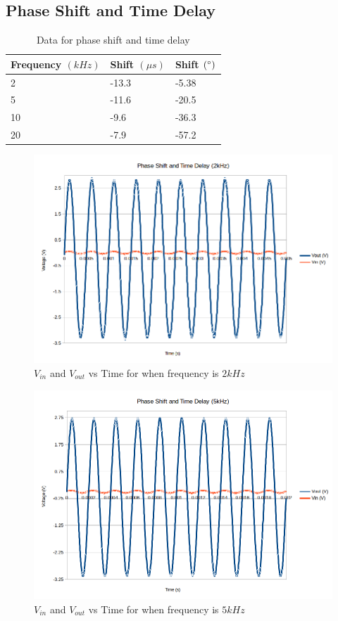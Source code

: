 \documentclass[10pt]{article}
\begin{document}
\subsection*{Phase Shift and Time Delay}
\begin{table}[H]
	\centering
	\begin{tabular}{lll}
		\hline
		Frequency $(kHz)$ & Shift $(\mu s)$ & Shift $(\degree)$\\
		\hline
		2 & -13.3 & -5.38\\
		5 & -11.6 & -20.5\\
		10 & -9.6 & -36.3\\
		20 & -7.9 & -57.2\\
		\hline
	\end{tabular}
	\caption{Data for phase shift and time delay}
\end{table}
\begin{figure}[H]
	\centering
	\includegraphics[width=\textwidth]{PhaseShift2.png}
	\caption{$V_{in}$ and $V_{out}$ vs Time for when frequency is $2kHz$}
\end{figure}
\begin{figure}[H]
	\centering
	\includegraphics[width=\textwidth]{PhaseShift5.png}
	\caption{$V_{in}$ and $V_{out}$ vs Time for when frequency is $5kHz$}
\end{figure}
\end{document}
